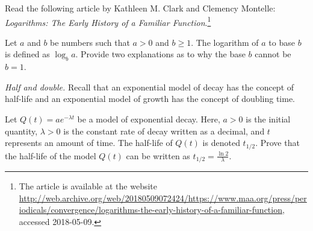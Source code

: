 \documentclass[a4paper,oneside,12pt]{article}
\begin{document}
\begin{problem}
\item Read the following article by Kathleen M. Clark and Clemency
  Montelle:
  \emph{Logarithms: The Early History of a Familiar Function}.\footnote{
    The article is available at the website
    \url{http://web.archive.org/web/20180509072424/https://www.maa.org/press/periodicals/convergence/logarithms-the-early-history-of-a-familiar-function},
    accessed 2018-05-09.
  }

\item Let $a$ and $b$ be numbers such that $a > 0$ and $b \geq 1$.
  The logarithm of $a$ to base $b$ is defined as $\log_b a$.  Provide
  two explanations as to why the base $b$ cannot be $b = 1$.

\item\emph{Half and double.}
  Recall that an exponential model of decay has the concept of
  half-life and an exponential model of growth has the concept of
  doubling time.
  \begin{packedenum}
  \item\label{subprob:logarithm:half_life}
    Let $Q(t) = a e^{-\lambda t}$ be a model of exponential decay.
    Here, $a > 0$ is the initial quantity, $\lambda > 0$ is the
    constant rate of decay written as a decimal, and $t$ represents an
    amount of time.  The half-life of $Q(t)$ is denoted $t_{1/2}$.
    Prove that the half-life of the model $Q(t)$ can be written as
    $t_{1/2} = \frac{\ln 2}{\lambda}$.


\end{packedenum}
\end{problem}
\end{document}

